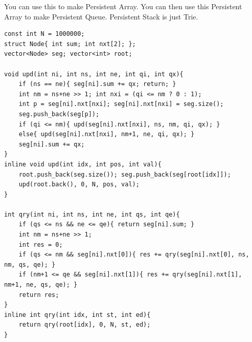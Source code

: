 You can use this to make Persistent Array. You can then use this Persistent Array to make Persistent Queue.
Persistent Stack is just Trie.
\begin{verbatim}
const int N = 1000000;
struct Node{ int sum; int nxt[2]; };
vector<Node> seg; vector<int> root;

void upd(int ni, int ns, int ne, int qi, int qx){
	if (ns == ne){ seg[ni].sum += qx; return; }
	int nm = ns+ne >> 1; int nxi = (qi <= nm ? 0 : 1);
	int p = seg[ni].nxt[nxi]; seg[ni].nxt[nxi] = seg.size();
	seg.push_back(seg[p]);
	if (qi <= nm){ upd(seg[ni].nxt[nxi], ns, nm, qi, qx); }
	else{ upd(seg[ni].nxt[nxi], nm+1, ne, qi, qx); }
	seg[ni].sum += qx;
}
inline void upd(int idx, int pos, int val){
	root.push_back(seg.size()); seg.push_back(seg[root[idx]]);
	upd(root.back(), 0, N, pos, val);
}

int qry(int ni, int ns, int ne, int qs, int qe){
	if (qs <= ns && ne <= qe){ return seg[ni].sum; }
	int nm = ns+ne >> 1;
	int res = 0;
	if (qs <= nm && seg[ni].nxt[0]){ res += qry(seg[ni].nxt[0], ns, nm, qs, qe); }
	if (nm+1 <= qe && seg[ni].nxt[1]){ res += qry(seg[ni].nxt[1], nm+1, ne, qs, qe); }
	return res;
}
inline int qry(int idx, int st, int ed){
	return qry(root[idx], 0, N, st, ed);
}
\end{verbatim}